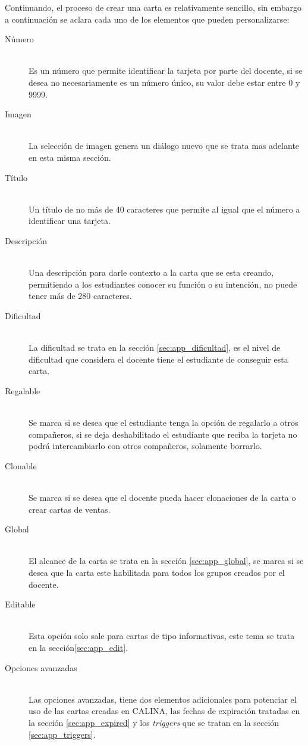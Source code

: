 Continuando, el proceso de crear una carta es relativamente sencillo, sin embargo a continuación se aclara 
cada uno de los elementos que pueden personalizarse:

\begin{description}
  \item[Número] \hfill \\ Es un número que permite identificar la tarjeta por parte del docente, si se desea 
	  no necesariamente es un número único, su valor debe estar entre 0 y 9999.
  \item[Imagen] \hfill \\ La selección de imagen genera un diálogo nuevo que se trata mas adelante en esta 
	  misma sección.
  \item[Título] \hfill \\ Un título de no más de 40 caracteres que permite al igual que el número a 
	  identificar una tarjeta.
  \item[Descripción] \hfill \\ Una descripción para darle contexto a la carta que se esta creando, permitiendo 
	  a los estudiantes conocer su función o su intención, no puede tener más de 280 caracteres.
  \item[Dificultad] \hfill \\ La dificultad se trata en la sección \ref{sec:app_dificultad}, es el nivel de 
	  dificultad que considera el docente tiene el estudiante de conseguir esta carta.
  \item[Regalable] \hfill \\ Se marca si se desea que el estudiante tenga la opción de regalarlo a otros 
	  compañeros, si se deja deshabilitado el estudiante que reciba la tarjeta no podrá intercambiarlo con 
	  otros compañeros, solamente borrarlo.
  \item[Clonable] \hfill \\ Se marca si se desea que el docente pueda hacer clonaciones de la carta o crear 
	  cartas de ventas.
  \item[Global] \hfill \\ El alcance de la carta se trata en la sección \ref{sec:app_global}, se marca si se 
	  desea que la carta este habilitada para todos los grupos creados por el docente.
  \item[Editable] \hfill \\ Esta opción solo sale para cartas de tipo informativas, este tema se trata en la 
	  sección\ref{sec:app_edit}.
  \item[Opciones avanzadas] \hfill \\ Las opciones avanzadas, tiene dos elementos adicionales para potenciar 
	  el uso de las cartas creadas en CALINA, las fechas de expiración tratadas en la sección 
	  \ref{sec:app_expired} y los \textit{triggers} que se tratan en la sección \ref{sec:app_triggers}.
\end{description}

